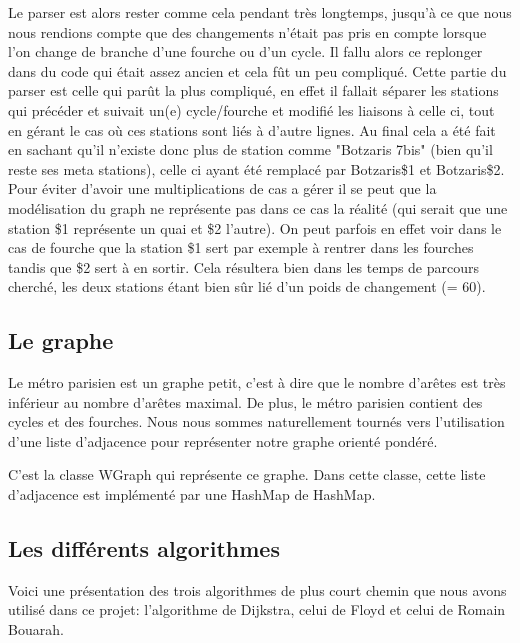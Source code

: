 \documentclass[french, 12pt]{article}
\begin{document}
Le parser est alors rester comme cela pendant très longtemps, jusqu'à ce que nous nous rendions compte que des changements n'était pas pris en compte lorsque l'on change de branche d'une fourche ou d'un cycle. Il fallu alors ce replonger dans du code qui était assez ancien et cela fût un peu compliqué. Cette partie du parser est celle qui parût la plus compliqué, en effet il fallait séparer les stations qui précéder et suivait un(e) cycle/fourche et modifié les liaisons à celle ci, tout en gérant le cas où ces stations sont liés à d'autre lignes. Au final cela a été fait en sachant qu'il n'existe donc plus de station comme "Botzaris 7bis" (bien qu'il reste ses meta stations), celle ci ayant été remplacé par Botzaris\$1 et Botzaris\$2. Pour éviter d'avoir une multiplications de cas a gérer il se peut que la modélisation du graph ne représente pas dans ce cas la réalité (qui serait que une station \$1 représente un quai et \$2 l'autre). On peut parfois en effet voir dans le cas de fourche que la station \$1 sert par exemple à rentrer dans les fourches tandis que \$2 sert à en sortir. Cela résultera bien dans les temps de parcours cherché, les deux stations étant bien sûr lié d'un poids de changement (= 60).

\subsection{Le graphe}
Le métro parisien est un graphe petit, c'est à dire que le nombre d'arêtes est très inférieur au nombre d'arêtes maximal. De plus, le métro parisien contient des cycles et des fourches.
Nous nous sommes naturellement tournés vers l'utilisation d'une liste d'adjacence pour représenter notre graphe orienté pondéré.

C'est la classe WGraph qui représente ce graphe. Dans cette classe, cette liste d'adjacence est implémenté par une HashMap de HashMap.


\subsection{Les différents algorithmes}
Voici une présentation des trois algorithmes de plus court chemin que nous avons utilisé dans ce projet: l'algorithme de Dijkstra, celui de Floyd et celui de Romain Bouarah.
\end{document}
